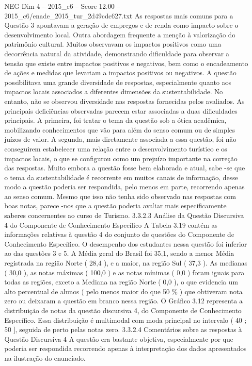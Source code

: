 \begin{textsample}{NEG Dim 4 – 2015\_c6 – Score 12.00 – 2015\_c6/enade\_2015\_tur\_2d49cdc627.txt}
As respostas mais comuns para a Questão 3 apontavam a geração de empregos e de renda como impacto sobre o desenvolvimento local.
Outra abordagem frequente a menção à valorização do patrimônio cultural.
Muitos observavam os impactos positivos como uma decorrência natural da atividade, demonstrando dificuldade para observar a tensão que existe entre impactos positivos e negativos, bem como o encadeamento de ações e medidas que levariam a impactos positivos ou negativos.
A questão possibilitava uma grande diversidade de respostas, especialmente quanto aos impactos locais associados a diferentes dimensões da sustentabilidade.
No entanto, não se observou diversidade nas respostas fornecidas pelos avaliados.
As principais deficiências observadas parecem estar associadas a duas dificuldades principais.
A primeira, foi tratar o tema da questão sob a ótica acadêmica, mobilizando conhecimentos que vão para além do senso comum ou de simples juízos de valor.
A segunda, mais diretamente associada a essa questão, foi não conseguirem estabelecer uma relação entre o desenvolvimento turístico e os impactos locais, o que se configurou como um prejuízo importante na correção das respostas.
Muito embora a questão fosse bem elaborada e atual, sabe -se que o tema da sustentabilidade é recorrente em muitos canais de informação, desse modo a questão poderia ser respondida, pelo menos em parte, recorrendo apenas ao senso comum.
Mesmo que isso não tenha sido observado nas respostas com boas notas, parece -nos que a questão poderia avaliar mais especificamente saberes concernentes ao curso de Turismo. 3.3.2.3 Análise da Questão Discursiva 4 do Componente de Conhecimento Específico A Tabela 3.19 contém as informações relativas à questão 4 do conjunto de questões do Componente de Conhecimento Específico.
O desempenho dos estudantes nessa questão foi inferior ao das questões 3 e 5.
A Média geral do Brasil foi 35,1, sendo a menor Média registrada na região Norte ( 28,4 ), e a maior, na região Sul ( 37,3 ).
As medianas ( 30,0 ), as notas máximas ( 100,0 ) e as notas mínimas ( 0,0 ) foram iguais para todas as regiões, exceto a Mediana na região Norte ( 0,0 ), o que evidencia um alto percentual de alunos ( pelo menos maior do que 50 \% ) que obtiveram nota zero ou deixaram a questão em branco nessa região.
O Gráfico 3.12 representa a distribuição de notas da questão discursiva 4, do Componente de Conhecimento Específico.
Essa distribuição é multimodal com moda principal no intervalo ( 40 ; 50 ], seguida de perto pelas notas zero. 3.3.2.4 Comentários sobre as respostas à Questão Discursiva 4 A questão era bastante objetiva, especialmente por que poderia ser respondida recorrendo apenas à interpretação dos dados apresentados na ilustração do enunciado.

\end{textsample}
